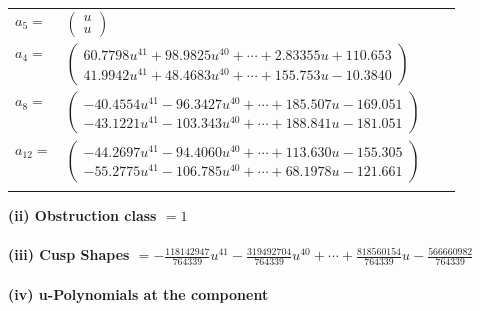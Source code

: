 \documentclass[1p]{elsarticle_modified}
\theoremstyle{definition}
\begin{document}
\begin{tabular}{m{7pt} m{180pt} m{7pt} m{180pt} }
\flushright $a_{5}=$&$\begin{pmatrix}u\\u\end{pmatrix}$ \\
\flushright $a_{4}=$&$\begin{pmatrix}60.7798 u^{41}+98.9825 u^{40}+\cdots+2.83355 u+110.653\\41.9942 u^{41}+48.4683 u^{40}+\cdots+155.753 u-10.3840\end{pmatrix}$ \\
\flushright $a_{8}=$&$\begin{pmatrix}-40.4554 u^{41}-96.3427 u^{40}+\cdots+185.507 u-169.051\\-43.1221 u^{41}-103.343 u^{40}+\cdots+188.841 u-181.051\end{pmatrix}$ \\
\flushright $a_{12}=$&$\begin{pmatrix}-44.2697 u^{41}-94.4060 u^{40}+\cdots+113.630 u-155.305\\-55.2775 u^{41}-106.785 u^{40}+\cdots+68.1978 u-121.661\end{pmatrix}$\\&\end{tabular}
\flushleft \textbf{(ii) Obstruction class $= 1$}\\~\\
\flushleft \textbf{(iii) Cusp Shapes $= -\frac{118142947}{764339} u^{41}-\frac{319492704}{764339} u^{40}+\cdots+\frac{818560154}{764339} u-\frac{566660982}{764339}$}\\~\\
\newpage\renewcommand{\arraystretch}{1}
\flushleft \textbf{(iv) u-Polynomials at the component}\newline \\
\end{document}
